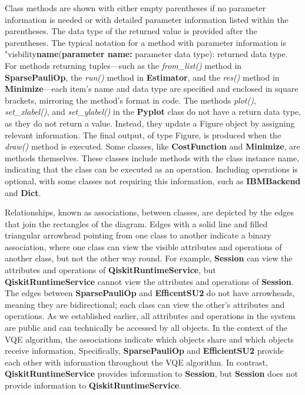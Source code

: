 \documentclass{article}
\begin{document}
Class methods are shown with either empty parentheses if no parameter information is needed or with detailed parameter information listed within the parentheses. The data type of the returned value is provided after the parentheses. The typical notation for a method with parameter information is "visbility\textbf{name}(\textbf{parameter name:} parameter data type): returned data type. For methods returning tuples—such as the \textit{from\_list()} method in \textbf{SparsePauliOp}, the \textit{run()} method in \textbf{Estimator}, and the \textit{res()} method in \textbf{Minimize}—each item's name and data type are specified and enclosed in square brackets, mirroring the method's format in code. 
The methods \textit{plot()}, \textit{set\_xlabel()}, and \textit{set\_ylabel()} in the \textbf{Pyplot} class do not have a return data type, as they do not return a value. Instead, they update a Figure object by assigning relevant information. The final output, of type Figure, is produced when the \textit{draw()} method is executed. 
Some classes, like \textbf{CostFunction} and \textbf{Minimize}, are methods themselves. These classes include methods with the class instance name, indicating that the class can be executed as an operation. Including operations is optional, with some classes not requiring this information, such as \textbf{IBMBackend} and \textbf{Dict}. 

Relationships, known as associations, between classes, are depicted by the edges that join the rectangles of the diagram. Edges with a solid line and filled triangular arrowhead pointing from one class to another indicate a binary association, where one class can view the visible attributes and operations of another class, but not the other way round\cite{Seidl_Scholz_Huemer_Kappel_Duffy_2014}. For example, \textbf{Session} can view the attributes and operations of \textbf{QiskitRuntimeService}, but \textbf{QiskitRuntimeService} cannot view the attributes and operations of \textbf{Session}. The edges between \textbf{SparsePauliOp} and \textbf{EfficentSU2} do not have arrowheads, meaning they are bidirectional\cite{Seidl_Scholz_Huemer_Kappel_Duffy_2014}; each class can view the other's attributes and operations. As we established earlier, all attributes and operations in the system are public and can technically be accessed by all objects. In the context of the VQE algorithm, the associations indicate which objects share and which objects receive information. Specifically, \textbf{SparsePauliOp} and \textbf{EfficientSU2} provide each other with information throughout the VQE algorithm. In contrast, \textbf{QiskitRuntimeService} provides information to \textbf{Session}, but \textbf{Session} does not provide information to \textbf{QiskitRuntimeService}.
\end{document}
